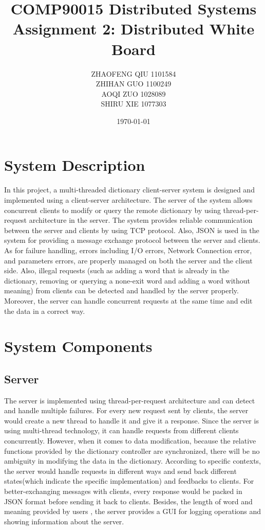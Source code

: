 \documentclass[a4paper]{article}
\title{COMP90015 Distributed Systems \\Assignment 2: Distributed White Board}
\author{ZHAOFENG QIU 1101584\\ ZHIHAN GUO 1100249\\ AOQI ZUO 1028089\\ SHIRU XIE 1077303}
\date{\today}
\begin{document}
\maketitle

\section{System Description}
\label{sec:systemDescription}

In this project, a multi-threaded dictionary client-server system is designed and implemented using a client-server architecture. The server of the system allows concurrent clients to modify or query the remote dictionary by using thread-per-request architecture in the server. The system provides reliable communication between the server and clients by using TCP protocol. Also, JSON is used in the system for providing a message exchange protocol between the server and clients. As for failure handling, errors including I/O errors, Network Connection error, and parameters errors, are properly managed on both the server and the client side. Also, illegal requests (such as adding a word that is already in the dictionary, removing or querying a none-exit word and adding a word without meaning) from clients can be detected and handled by the server properly. Moreover, the server can handle concurrent requests at the same time and edit the data in a correct way.

\section{System Components} %
\label{sec:theory}
\subsection{Server}
The server is implemented using thread-per-request architecture and can detect and handle multiple failures. For every new request sent by clients, the server would create a new thread to handle it and give it a response. Since the server is using multi-thread technology, it can handle requests from different clients concurrently. However, when it comes to data modification, because the relative functions provided by the dictionary controller are synchronized, there will be no ambiguity in modifying the data in the dictionary. According to specific contexts, the server would handle requests in different ways and send back different states(which indicate the specific implementation) and feedbacks to clients. For better-exchanging messages with clients,  every response would be packed in JSON format before sending it back to clients. Besides, the length of word and meaning provided by users , the server provides a GUI for logging operations and showing information about the server.
\end{document}
